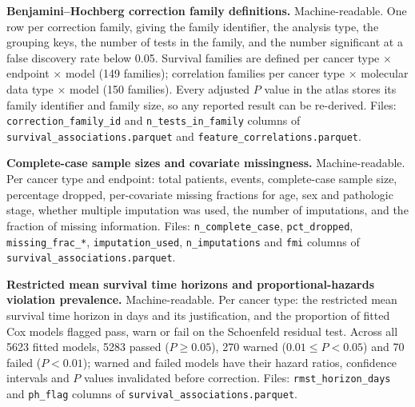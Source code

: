 \documentclass[11pt]{article}
\begin{document}
\begin{table}[htbp]
\centering
\caption{\textbf{Benjamini--Hochberg correction family definitions.}
Machine-readable. One row per correction family, giving the family identifier,
the analysis type, the grouping keys, the number of tests in the family, and the
number significant at a false discovery rate below 0.05. Survival families are
defined per cancer type $\times$ endpoint $\times$ model (149 families);
correlation families per cancer type $\times$ molecular data type $\times$ model
(150 families). Every adjusted $P$ value in the atlas stores its family
identifier and family size, so any reported result can be re-derived.
Files: \texttt{correction\_family\_id} and \texttt{n\_tests\_in\_family} columns
of \texttt{survival\_associations.parquet} and
\texttt{feature\_correlations.parquet}.}
\label{tab:s5}
\end{table}

\begin{table}[htbp]
\centering
\caption{\textbf{Complete-case sample sizes and covariate missingness.}
Machine-readable. Per cancer type and endpoint: total patients, events,
complete-case sample size, percentage dropped, per-covariate missing fractions
for age, sex and pathologic stage, whether multiple imputation was used, the
number of imputations, and the fraction of missing information.
Files: \texttt{n\_complete\_case}, \texttt{pct\_dropped},
\texttt{missing\_frac\_*}, \texttt{imputation\_used}, \texttt{n\_imputations} and
\texttt{fmi} columns of \texttt{survival\_associations.parquet}.}
\label{tab:s6}
\end{table}

\begin{table}[htbp]
\centering
\caption{\textbf{Restricted mean survival time horizons and
proportional-hazards violation prevalence.} Machine-readable. Per cancer type:
the restricted mean survival time horizon in days and its justification, and the
proportion of fitted Cox models flagged pass, warn or fail on the Schoenfeld
residual test. Across all \num{5623} fitted models, \num{5283} passed
($P \geq 0.05$), 270 warned ($0.01 \leq P < 0.05$) and 70 failed ($P < 0.01$);
warned and failed models have their hazard ratios, confidence intervals and
$P$ values invalidated before correction.
Files: \texttt{rmst\_horizon\_days} and \texttt{ph\_flag} columns of
\texttt{survival\_associations.parquet}.}
\label{tab:s7}
\end{table}
\end{document}
